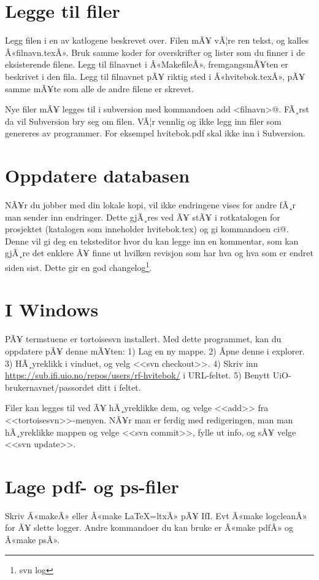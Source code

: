\documentclass[11pt,norsk,a4paper,pointlessnumbers]{scrbook}
\begin{document}
\section{Legge til filer}
Legg filen i en av katlogene beskrevet over. Filen mÃ¥ vÃ¦re ren tekst,
og kalles Â«filnavn.texÂ». Bruk samme koder for overskrifter og lister
som du finner i de eksisterende filene. Legg til filnavnet i Â«MakefileÂ»,
fremgangsmÃ¥ten er beskrivet i den fila. Legg til filnavnet pÃ¥ riktig
sted i Â«hvitebok.texÂ», pÃ¥ samme mÃ¥te som alle de andre filene er skrevet.

Nye filer mÃ¥ legges til i subversion med kommandoen \verb@svn add <filnavn>@.
FÃ¸rst da vil Subversion bry seg om filen. VÃ¦r vennlig og ikke legg inn filer
som genereres av programmer. For eksempel hvitebok.pdf skal ikke inn i Subversion.

\section{Oppdatere databasen}
NÃ¥r du jobber med din lokale kopi, vil ikke endringene vises for andre fÃ¸r man
sender inn endringer. Dette gjÃ¸res ved Ã¥ stÃ¥ i rotkatalogen for prosjektet (katalogen
som inneholder hvitebok.tex) og gi kommandoen \verb@svn ci@. Denne vil gi deg en teksteditor
hvor du kan legge inn en kommentar, som kan gjÃ¸re det enklere Ã¥ finne ut hvilken revisjon
som har hva og hva som er endret siden sist. Dette gir en god changelog\footnote{svn log}.

\section{I Windows}
PÃ¥ termstuene er tortoisesvn installert. Med dette programmet, kan du oppdatere pÃ¥ denne mÃ¥ten:
1) Lag en ny mappe. 2) Ãpne denne i explorer. 3) HÃ¸yreklikk i vinduet, og velg <<svn checkout>>.
4) Skriv inn \url{https://sub.ifi.uio.no/repos/users/rf-hvitebok/} i URL-feltet. 
5) Benytt UiO-brukernavnet/passordet ditt i feltet.

Filer kan legges til ved Ã¥ hÃ¸yreklikke dem, og velge <<add>> fra <<tortoisesvn>>-menyen. NÃ¥r man er
ferdig med redigeringen, man man hÃ¸yreklikke mappen og velge <<svn commit>>, fylle ut info, og sÃ¥
velge <<svn update>>.

\section{Lage pdf- og ps-filer}
Skriv Â«makeÂ» eller Â«make LaTeX=ltxÂ» pÃ¥ IfI.
Evt Â«make logcleanÂ» for Ã¥ slette logger.
Andre kommandoer du kan bruke er Â«make pdfÂ» og Â«make psÂ».
\end{document}
